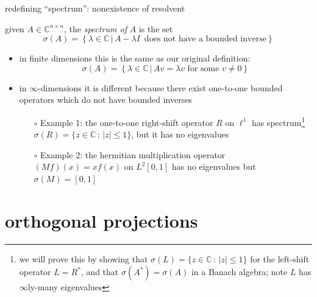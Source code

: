 \documentclass[10pt,hyperref]{beamer}
\newcommand{\CC}{\mathbb{C}}
\begin{document}
\begin{frame}{redefining ``spectrum'': nonexistence of resolvent}

\begin{definition}
given $A\in\CC^{n\times n}$, the \emph{spectrum of} $A$ is the set
    $$\sigma(A) = \left\{\lambda\in\CC\,\big|\,A-\lambda I \,\text{ does not have a bounded inverse} \right\}$$
\end{definition}

\begin{itemize}
\item in finite dimensions this is the same as our original definition:
    $$\sigma(A)=\left\{\lambda\in\CC\,\big|\,Av=\lambda v \text{ for some }v\ne 0\right\}$$
\item in $\infty$-dimensions it is different because there exist one-to-one bounded operators which do not have bounded inverses
    \begin{itemize}
    \item[$\circ$] Example 1: the one-to-one right-shift operator $R$ on $\ell^1$ has spectrum\footnote{we will prove this by showing that $\sigma(L) = \{z\in\CC\,:\,|z|\le 1\}$ for the left-shift operator $L=R^*$, and that $\sigma(A^*)=\sigma(A)$ in a Banach algebra; note $L$ has $\infty$ly-many eigenvalues} $\sigma(R) = \{z\in\CC\,:\,|z|\le 1\}$, but it has no eigenvalues
    \item[$\circ$] Example 2: the hermitian multiplication operator $(M f)(x) = x f(x)$ on $L^2[0,1]$ has no eigenvalues but $\sigma(M) = [0,1]$
    \end{itemize}
\end{itemize}
\end{frame}


\section{orthogonal projections}
\end{document}
